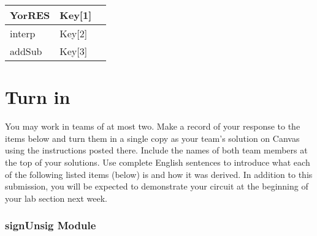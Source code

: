 \begin{longtable}[]{@{}
  >{\raggedright\arraybackslash}p{}
  >{\raggedright\arraybackslash}p{}
  >{\raggedright\arraybackslash}p{}@{}}
\toprule()
YorRES & Key{[}1{]} & \\
\midrule()
\endhead
interp & Key{[}2{]} & \\ \hline
addSub & Key{[}3{]} & \\ \hline
\bottomrule()
\end{longtable}

\section{Turn in}

You may work in teams of at most two. Make a record of your response to
the items below and turn them in a single copy as your team's solution
on Canvas using the instructions posted there. Include the names of both
team members at the top of your solutions. Use complete English
sentences to introduce what each of the following listed items (below)
is and how it was derived. In addition to this submission, you will be
expected to demonstrate your circuit at the beginning of your lab
section next week.

\subsubsection{signUnsig Module}

